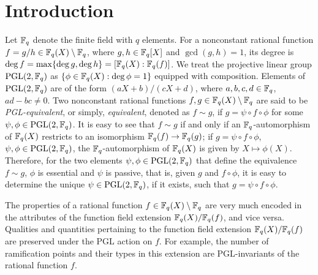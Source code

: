 \documentclass{amsart}
\numberwithin{equation}{section}
\theoremstyle{definition}
\newcommand{\f}{\Bbb F}
\newcommand{\pgl}{\mathrm{PGL}}
\begin{document}
\section{Introduction}

Let $\f_q$ denote the finite field with $q$ elements. For a nonconstant rational function $f=g/h\in\f_q(X)\setminus\f_q$, where $g,h\in\f_q[X]$ and $\gcd(g,h)=1$, its degree is $\deg f=\max\{\deg g,\deg h\}=[\f_q(X):\f_q(f)]$. We treat the projective linear group $\pgl(2,\f_q)$ as $\{\phi\in\f_q(X):\deg\phi=1\}$ equipped with composition.
Elements of $\pgl(2,\f_q)$ are of the form $(aX+b)/(cX+d)$, where $a,b,c,d\in\f_q$, $ad-bc\ne 0$. Two nonconstant rational functions $f,g\in\f_q(X)\setminus\f_q$ are said to be {\em PGL-equivalent}, or simply, {\em equivalent}, denoted as $f\sim g$, if $g=\psi\circ f\circ \phi$ for some $\psi,\phi\in \pgl(2,\f_q)$. It is easy to see that $f\sim g$ if and only if an $\f_q$-automorphism of $\f_q(X)$ restricts to an isomorphism $\f_q(f)\to\f_q(g)$; if $g=\psi\circ f\circ \phi$, $\psi,\phi\in\pgl(2,\f_q)$, the $\f_q$-automorphism of $\f_q(X)$ is given by $X\mapsto\phi(X)$. Therefore, for the two elements $\psi,\phi\in\pgl(2,\f_q)$ that define the equivalence $f\sim g$, $\phi$ is essential and $\psi$ is passive, that is, given $g$ and $f\circ\phi$, it is easy to determine the unique $\psi\in\pgl(2,\f_q)$, if it exists, such that $g=\psi\circ f\circ\phi$.

The properties of a rational function $f\in\f_q(X)\setminus\f_q$ are very much encoded in the attributes of the function field extension $\f_q(X)/\f_q(f)$, and vice versa. Qualities and quantities pertaining to the function field extension $\f_q(X)/\f_q(f)$ are preserved under the PGL action on $f$. For example, the number of ramification points and their types in this extension are PGL-invariants of the rational function $f$.  
\end{document}

